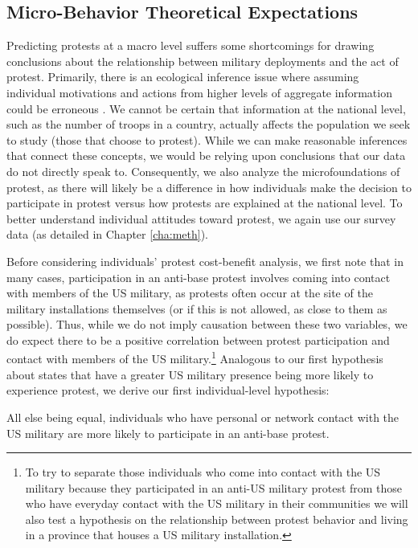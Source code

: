 \subsection*{Micro-Behavior Theoretical Expectations}
Predicting protests at a  macro level suffers some shortcomings for drawing conclusions about the relationship between military deployments and the act of protest. Primarily, there is an ecological inference issue where assuming individual motivations and actions from higher levels of aggregate information could be erroneous \cite{King2004}. We cannot be certain that information at the national level, such as the number of troops in a country, actually affects the population we seek to study (those that choose to protest). While we can make reasonable inferences that connect these concepts, we would be relying upon conclusions that our data do not directly speak to. Consequently, we also analyze the microfoundations of protest, as there will likely be a difference in how individuals make the decision to participate in protest versus how protests are explained at the national level. To better understand individual attitudes toward protest, we again use our survey data (as detailed in Chapter \ref{cha:meth}). 

Before considering individuals' protest cost-benefit analysis, we first note that in many cases, participation in an anti-base protest involves coming into contact with members of the US military, as protests often occur at the site of the military installations themselves (or if this is not allowed, as close to them as possible). Thus, while we do not imply causation between these two variables, we do expect there to be a positive correlation between protest participation and contact with members of the US military.\footnote{To try to separate those individuals who come into contact with the US military because they participated in an anti-US military protest from those who have everyday contact with the US military in their communities we will also test a hypothesis on the relationship between protest behavior and living in a province that houses a US military installation.} Analogous to our first hypothesis about states that have a greater US military presence being more likely to experience protest, we derive our first individual-level hypothesis:

\begin{hyp}
	All else being equal, individuals who have personal or network contact with the US military are more likely to participate in an anti-base protest. 
\end{hyp}

